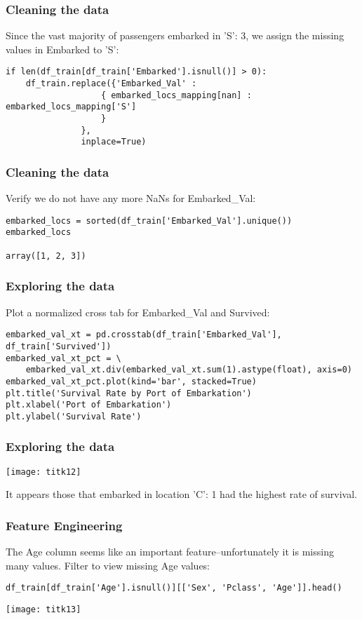 \begin{frame}[fragile]\frametitle{Cleaning  the data}
Since the vast majority of passengers embarked in 'S': 3, we assign the missing values in Embarked to 'S':
\begin{lstlisting}
if len(df_train[df_train['Embarked'].isnull()] > 0):
    df_train.replace({'Embarked_Val' : 
                   { embarked_locs_mapping[nan] : embarked_locs_mapping['S'] 
                   }
               }, 
               inplace=True)
\end{lstlisting}
\end{frame}

\begin{frame}[fragile]\frametitle{Cleaning  the data}
Verify we do not have any more NaNs for Embarked\_Val:
\begin{lstlisting}
embarked_locs = sorted(df_train['Embarked_Val'].unique())
embarked_locs

array([1, 2, 3])
\end{lstlisting}
\end{frame}

\begin{frame}[fragile]\frametitle{Exploring  the data}
Plot a normalized cross tab for Embarked\_Val and Survived:
\begin{lstlisting}
embarked_val_xt = pd.crosstab(df_train['Embarked_Val'], df_train['Survived'])
embarked_val_xt_pct = \
    embarked_val_xt.div(embarked_val_xt.sum(1).astype(float), axis=0)
embarked_val_xt_pct.plot(kind='bar', stacked=True)
plt.title('Survival Rate by Port of Embarkation')
plt.xlabel('Port of Embarkation')
plt.ylabel('Survival Rate')
\end{lstlisting}
\end{frame}

\begin{frame}[fragile]\frametitle{Exploring  the data}
\begin{center}
\texttt{[image: titk12]}
\end{center}
It appears those that embarked in location 'C': 1 had the highest rate of survival. 
\end{frame}

\begin{frame}[fragile]\frametitle{Feature Engineering}
The Age column seems like an important feature--unfortunately it is missing many values. Filter to view missing Age values:
\begin{lstlisting}
df_train[df_train['Age'].isnull()][['Sex', 'Pclass', 'Age']].head()
\end{lstlisting}
\begin{center}
\texttt{[image: titk13]}
\end{center}
\end{frame}

